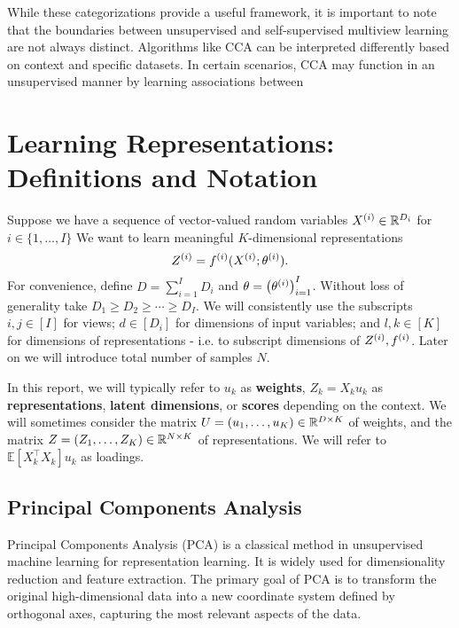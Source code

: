 While these categorizations provide a useful framework, it is important to note that the boundaries between unsupervised and self-supervised multiview learning are not always distinct. Algorithms like CCA can be interpreted differently based on context and specific datasets. In certain scenarios, CCA may function in an unsupervised manner by learning associations between

\section{Learning Representations: Definitions and Notation}

Suppose we have a sequence of vector-valued random variables $X^{(i)} \in \mathbb{R}^{D_i}$ for $i \in \{1, \dots, I \}$
We want to learn meaningful $K$-dimensional representations
\begin{equation}\label{eq:general-form-of-representations}
    Z^{(i)} = f^{(i)}( X^{(i)}; \theta^{(i)}).
\end{equation}
For convenience, define $D = \sum_{i=1}^I D_i$ and $\theta = \left(\theta^{(i)}\right)_{i=1}^I$.
Without loss of generality take $D_1 \geq D_2 \geq \cdots \geq D_I$.
We will consistently use the subscripts $i,j \in [I]$ for views;
$d \in [D_i]$ for dimensions of input variables;
and $l,k \in [K]$ for dimensions of representations - i.e. to subscript dimensions of $Z^{(i)}, f^{(i)}$.
Later on we will introduce total number of samples $N$.

In this report, we will typically refer to $u_k$ as \textbf{weights}, $Z_k = X_k u_k$ as \textbf{representations},
        \textbf{latent
dimensions}, or \textbf{scores} depending on the context. We will sometimes consider the
        matrix $U = \left(u_1, \dots, u_K\right) \in \mathbb{R}^{D \times K}$ of weights, and the
        matrix $Z = \left(Z_1, \dots, Z_K\right) \in \mathbb{R}^{N \times K}$ of representations. We will refer to $\mathbb{E
        }[X_k^\top X_k] u_k$ as loadings.

\subsection{Principal Components Analysis}

Principal Components Analysis (PCA)\cite{hotelling1933analysis} is a classical method in unsupervised machine learning for representation learning.
It is widely used for dimensionality reduction and feature extraction.
The primary goal of PCA is to transform the original high-dimensional data into a new coordinate system defined by orthogonal axes, capturing the most relevant aspects of the data.

